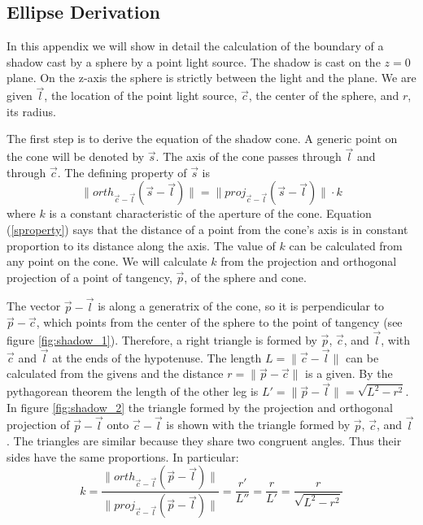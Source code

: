 \documentclass[10pt]{article}
\begin{document}
\begin{appendices}
\section{Ellipse Derivation} \label{app:ellipse_derivation}

In this appendix we will show in detail the calculation of the boundary of a shadow cast by a sphere by a point light source. The shadow is cast on the $z=0$ plane. On the z-axis the sphere is strictly between the light and the plane. We are given $\vec{l}$, the location of the point light source, $\vec{c}$, the center of the sphere, and $r$, its radius.

The first step is to derive the equation of the shadow cone. A generic point on the cone will be denoted by $\vec{s}$. The axis of the cone passes through $\vec{l}$ and through $\vec{c}$. The defining property of $\vec{s}$ is 
\begin{equation}\label{sproperty}
\|orth_{\vec{c}-\vec{l}} (\vec{s} - \vec{l})\| = \|proj_{\vec{c}-\vec{l}} (\vec{s} - \vec{l})\| \cdot k
\end{equation}
where $k$ is a constant characteristic of the aperture of the cone. Equation (\ref{sproperty}) says that the distance of a point from the cone's axis is in constant proportion to its distance along the axis. The value of $k$ can be calculated from any point on the cone. We will calculate $k$ from the projection and orthogonal projection of a point of tangency, $\vec{p}$, of the sphere and cone.

The vector $\vec{p} - \vec{l}$ is along a generatrix of the cone, so it is perpendicular to $\vec{p} - \vec{c}$, which points from the center of the sphere to the point of tangency (see figure \ref{fig:shadow_1}). Therefore, a right triangle is formed by $\vec{p}$, $\vec{c}$, and $\vec{l}$, with $\vec{c}$ and $\vec{l}$ at the ends of the hypotenuse. The length $L=\|\vec{c}-\vec{l}\|$ can be calculated from the givens and the distance $r=\|\vec{p}-\vec{c}\|$ is a given. By the pythagorean theorem the length of the other leg is $L'=\|\vec{p}-\vec{l}\|=\sqrt{L^2-r^2}$. In figure \ref{fig:shadow_2} the triangle formed by the projection and orthogonal projection of $\vec{p}-\vec{l}$ onto $\vec{c}-\vec{l}$ is shown with the triangle formed by $\vec{p}$, $\vec{c}$, and $\vec{l}$. The triangles are similar because they share two congruent angles. Thus their sides have the same proportions. In particular:
\[
k = \frac{\|orth_{\vec{c}-\vec{l}} (\vec{p} - \vec{l})\|}{\|proj_{\vec{c}-\vec{l}} (\vec{p} - \vec{l})\|} = \frac{r'}{L''} = \frac{r}{L'} = \frac{r}{\sqrt{L^2-r^2}}
\]


\end{appendices}
\end{document}

